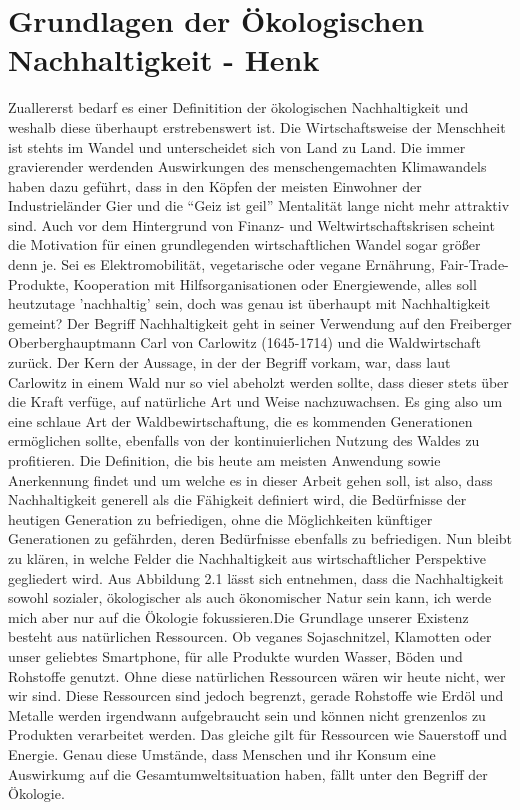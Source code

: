 \chapter{Grundlagen der Ökologischen Nachhaltigkeit - Henk}
Zuallererst bedarf es einer Definitition der ökologischen Nachhaltigkeit und weshalb diese überhaupt erstrebenswert ist. Die Wirtschaftsweise der Menschheit ist stehts im Wandel und unterscheidet sich von Land zu Land. Die immer gravierender werdenden Auswirkungen des menschengemachten Klimawandels haben dazu geführt, dass in den Köpfen der meisten Einwohner der Industrieländer Gier und die ``Geiz ist geil'' Mentalität lange nicht mehr attraktiv sind. Auch vor dem Hintergrund von Finanz- und Weltwirtschaftskrisen scheint die Motivation für einen grundlegenden wirtschaftlichen Wandel sogar größer denn je. Sei es Elektromobilität, vegetarische oder vegane Ernährung, Fair-Trade-Produkte, Kooperation mit Hilfsorganisationen oder Energiewende, alles soll heutzutage 'nachhaltig' sein, doch was genau ist überhaupt mit Nachhaltigkeit gemeint? \newline Der Begriff Nachhaltigkeit geht in seiner Verwendung auf den Freiberger Oberberghauptmann Carl von Carlowitz (1645-1714) und die Waldwirtschaft zurück\cite{doi:nachhaltig}. Der Kern der Aussage, in der der Begriff vorkam, war, dass laut Carlowitz in einem Wald nur so viel abeholzt werden sollte, dass dieser stets über die Kraft verfüge, auf natürliche Art und Weise nachzuwachsen. Es ging also um eine schlaue Art der Waldbewirtschaftung, die es kommenden Generationen ermöglichen sollte, ebenfalls von der kontinuierlichen Nutzung des Waldes zu profitieren. Die Definition, die bis heute am meisten Anwendung sowie Anerkennung findet und um welche es in dieser Arbeit gehen soll, ist also, dass Nachhaltigkeit generell als die Fähigkeit definiert wird, die Bedürfnisse der heutigen Generation zu befriedigen, ohne die Möglichkeiten künftiger Generationen zu gefährden, deren Bedürfnisse ebenfalls zu befriedigen. \newline Nun bleibt zu klären, in welche Felder die Nachhaltigkeit aus wirtschaftlicher Perspektive gegliedert wird. Aus Abbildung 2.1 lässt sich entnehmen, dass die Nachhaltigkeit sowohl sozialer, ökologischer als auch ökonomischer Natur sein kann, ich werde mich aber nur auf die Ökologie fokussieren.\clearpage Die Grundlage unserer Existenz besteht aus natürlichen Ressourcen. Ob veganes Sojaschnitzel, Klamotten oder unser geliebtes Smartphone, für alle Produkte wurden Wasser, Böden und Rohstoffe genutzt. Ohne diese natürlichen Ressourcen wären wir heute nicht, wer wir sind. Diese Ressourcen sind jedoch begrenzt, gerade Rohstoffe wie Erdöl und Metalle werden irgendwann aufgebraucht sein und können nicht grenzenlos zu Produkten verarbeitet werden. Das gleiche gilt für Ressourcen wie Sauerstoff und Energie. Genau diese Umstände, dass Menschen und ihr Konsum eine Auswirkumg auf die Gesamtumweltsituation haben, fällt unter den Begriff der Ökologie. 
